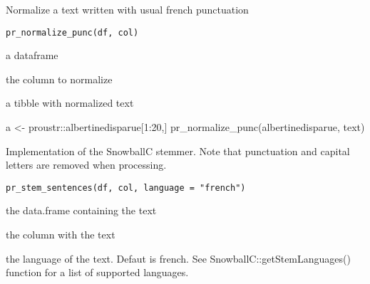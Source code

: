 \documentclass[a4paper]{book}
\begin{document}
%
\begin{Description}\relax
Normalize a text written with usual french punctuation
\end{Description}
%
\begin{Usage}
\begin{verbatim}
pr_normalize_punc(df, col)
\end{verbatim}
\end{Usage}
%
\begin{Arguments}
\begin{ldescription}
\item[\code{df}] a dataframe

\item[\code{col}] the column to normalize
\end{ldescription}
\end{Arguments}
%
\begin{Value}
a tibble with normalized text
\end{Value}
%
\begin{Examples}
\begin{ExampleCode}
a <- proustr::albertinedisparue[1:20,]
pr_normalize_punc(albertinedisparue, text)
\end{ExampleCode}
\end{Examples}
%
\begin{Description}\relax
Implementation of the SnowballC stemmer. Note that punctuation and capital letters 
are removed when processing.
\end{Description}
%
\begin{Usage}
\begin{verbatim}
pr_stem_sentences(df, col, language = "french")
\end{verbatim}
\end{Usage}
%
\begin{Arguments}
\begin{ldescription}
\item[\code{df}] the data.frame containing the text

\item[\code{col}] the column with the text

\item[\code{language}] the language of the text. Defaut is french. See SnowballC::getStemLanguages() function for a list of supported languages.
\end{ldescription}
\end{Arguments}
\end{document}
